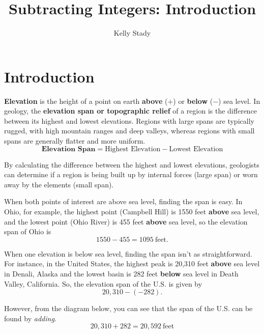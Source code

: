 \documentclass{ximera}[font=12pt]
\title{Subtracting Integers:  Introduction}   %
\author{Kelly Stady}
\begin{document}
\begin{abstract}

\end{abstract}

\maketitle
\label{xim:SubtractIntActivity}


\section*{Introduction}

\textbf{Elevation} is the height of a point on earth \textbf{above} ($+$) or \textbf{below} ($-$) sea level.  In geology, the \textbf{elevation span or topographic relief} of a region is the difference between its highest and lowest elevations. Regions with large spans are typically rugged, with high mountain ranges and deep valleys, whereas regions with small spans are generally flatter and more uniform.
\[ \textbf{Elevation Span} = \textrm{Highest Elevation} - \textrm{Lowest Elevation} \]

By calculating the difference between the highest and lowest elevations, geologists can determine if a region is being built up by internal forces (large span) or worn away by the elements (small span).

When both points of interest are above sea level, finding the span is easy.  In Ohio, for example, the highest point (Campbell Hill) is 1550 
feet \textbf{above} sea level, and the lowest point (Ohio River) is 455 feet \textbf{above} sea level, so the elevation span of Ohio is
\[ 1550 - 455 = 1095 \ \textrm{feet}. \]

When one elevation is below sea level, finding the span isn't as straightforward.  For instance, in the United States, the highest peak is 20,310 feet \textbf{above} sea level in Denali, Alaska and the lowest basin is 282 feet \textbf{below} sea level in Death Valley, California.  So, the elevation span of the U.S. is given by
\[ 20,310 - (-282). \]

However, from the diagram below, you can see that the span of the U.S. can be found by \emph{adding}.
\[ 20,310 + 282 = 20,592 \ \textrm{feet} \]
\end{document}
